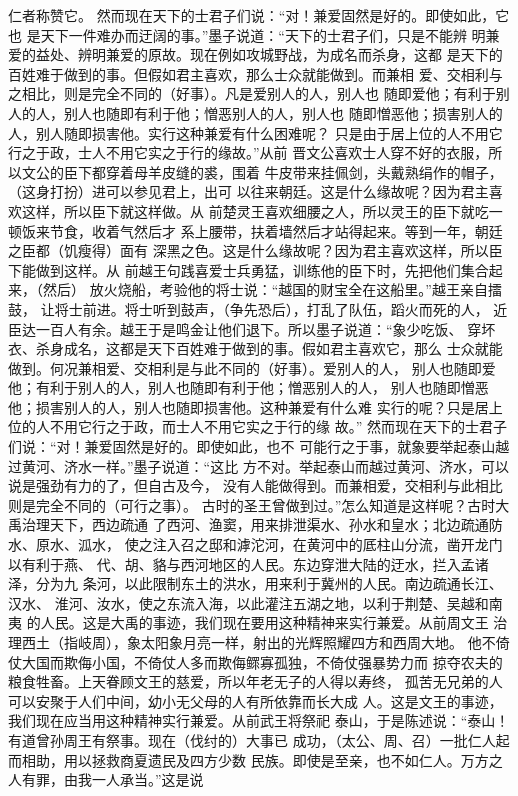 \documentclass[12pt,UTF8]{ctexbook}
\begin{document}
仁者称赞它。 
然而现在天下的士君子们说：“对！兼爱固然是好的。即使如此，它也 
是天下一件难办而迂阔的事。”墨子说道：“天下的士君子们，只是不能辨 
明兼爱的益处、辨明兼爱的原故。现在例如攻城野战，为成名而杀身，这都 
是天下的百姓难于做到的事。但假如君主喜欢，那么士众就能做到。而兼相 
爱、交相利与之相比，则是完全不同的（好事）。凡是爱别人的人，别人也 
随即爱他；有利于别人的人，别人也随即有利于他；憎恶别人的人，别人也 
随即憎恶他；损害别人的人，别人随即损害他。实行这种兼爱有什么困难呢？ 
只是由于居上位的人不用它行之于政，士人不用它实之于行的缘故。”从前 
晋文公喜欢士人穿不好的衣服，所以文公的臣下都穿着母羊皮缝的裘，围着 
牛皮带来挂佩剑，头戴熟绢作的帽子，（这身打扮）进可以参见君上，出可 
以往来朝廷。这是什么缘故呢？因为君主喜欢这样，所以臣下就这样做。从 
前楚灵王喜欢细腰之人，所以灵王的臣下就吃一顿饭来节食，收着气然后才 
系上腰带，扶着墙然后才站得起来。等到一年，朝廷之臣都（饥瘦得）面有 
深黑之色。这是什么缘故呢？因为君主喜欢这样，所以臣下能做到这样。从 
前越王句践喜爱士兵勇猛，训练他的臣下时，先把他们集合起来，（然后） 
放火烧船，考验他的将士说：“越国的财宝全在这船里。”越王亲自擂鼓， 
让将士前进。将士听到鼓声，（争先恐后），打乱了队伍，蹈火而死的人， 
近臣达一百人有余。越王于是鸣金让他们退下。所以墨子说道：“象少吃饭、 
穿坏衣、杀身成名，这都是天下百姓难于做到的事。假如君主喜欢它，那么 
士众就能做到。何况兼相爱、交相利是与此不同的（好事）。爱别人的人， 
别人也随即爱他；有利于别人的人，别人也随即有利于他；憎恶别人的人， 
别人也随即憎恶他；损害别人的人，别人也随即损害他。这种兼爱有什么难 
实行的呢？只是居上位的人不用它行之于政，而士人不用它实之于行的缘 
故。” 
然而现在天下的士君子们说：“对！兼爱固然是好的。即使如此，也不 
可能行之于事，就象要举起泰山越过黄河、济水一样。”墨子说道：“这比 
方不对。举起泰山而越过黄河、济水，可以说是强劲有力的了，但自古及今， 
没有人能做得到。而兼相爱，交相利与此相比则是完全不同的（可行之事）。 
古时的圣王曾做到过。”怎么知道是这样呢？古时大禹治理天下，西边疏通 
了西河、渔窦，用来排泄渠水、孙水和皇水；北边疏通防水、原水、泒水， 
使之注入召之邸和滹沱河，在黄河中的厎柱山分流，凿开龙门以有利于燕、 
代、胡、貉与西河地区的人民。东边穿泄大陆的迂水，拦入孟诸泽，分为九 
条河，以此限制东土的洪水，用来利于冀州的人民。南边疏通长江、汉水、 
淮河、汝水，使之东流入海，以此灌注五湖之地，以利于荆楚、吴越和南夷 
的人民。这是大禹的事迹，我们现在要用这种精神来实行兼爱。从前周文王 
治理西土（指岐周），象太阳象月亮一样，射出的光辉照耀四方和西周大地。 
他不倚仗大国而欺侮小国，不倚仗人多而欺侮鳏寡孤独，不倚仗强暴势力而 
掠夺农夫的粮食牲畜。上天眷顾文王的慈爱，所以年老无子的人得以寿终， 
孤苦无兄弟的人可以安聚于人们中间，幼小无父母的人有所依靠而长大成 
人。这是文王的事迹，我们现在应当用这种精神实行兼爱。从前武王将祭祀 
泰山，于是陈述说：“泰山！有道曾孙周王有祭事。现在（伐纣的）大事已 
成功，（太公、周、召）一批仁人起而相助，用以拯救商夏遗民及四方少数 
民族。即使是至亲，也不如仁人。万方之人有罪，由我一人承当。”这是说 
\end{document}
